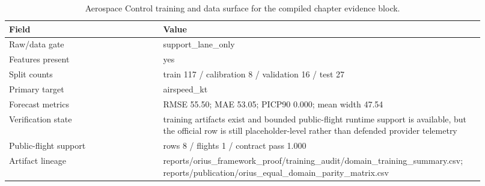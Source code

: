 \begin{table}[htbp]
\centering
\small
\caption{Aerospace Control training and data surface for the compiled chapter evidence block.}
\label{tab:aerospace-training-surface}
\begin{tabular}{p{0.31\linewidth}p{0.61\linewidth}}
\toprule
\textbf{Field} & \textbf{Value}\\
\midrule
Raw/data gate & support\_lane\_only\\
Features present & yes\\
Split counts & train 117 / calibration 8 / validation 16 / test 27\\
Primary target & airspeed\_kt\\
Forecast metrics & RMSE 55.50; MAE 53.05; PICP90 0.000; mean width 47.54\\
Verification state & training artifacts exist and bounded public-flight runtime support is available, but the official row is still placeholder-level rather than defended provider telemetry\\
Public-flight support & rows 8 / flights 1 / contract pass 1.000\\
Artifact lineage & reports/orius\_framework\_proof/training\_audit/domain\_training\_summary.csv; reports/publication/orius\_equal\_domain\_parity\_matrix.csv\\
\bottomrule
\end{tabular}
\end{table}
